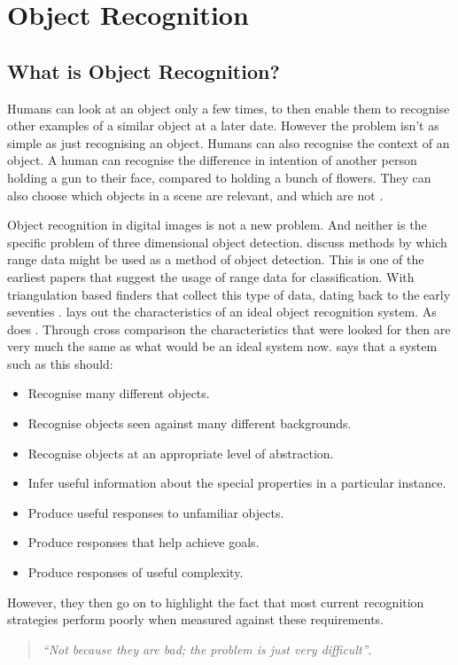 \documentclass[11pt,oneside]{report}
\begin{document}
			\section{Object Recognition}
				\subsection{What is Object Recognition?}
				Humans can look at an object only a few times, to then enable them to recognise other examples of a similar object at a later date.
				However the problem isn't as simple as just recognising an object.
				Humans can also recognise the context of an object.
				A human can recognise the difference in intention of another person holding a gun to their face, compared to holding a bunch of flowers.
				They can also choose which objects in a scene are relevant, and which are not \cite{book:modern}.
				
				Object recognition in digital images is not a new problem.
				And neither is the specific problem of three dimensional object detection.
				 discuss methods by which range data might be used as a method of object detection.
				This is one of the earliest papers that suggest the usage of range data for classification.
				With triangulation based finders that collect this type of data, dating back to the early seventies \cite{journal:range}.
				 lays out the characteristics of an ideal object recognition system.
				As does .
				Through cross comparison the characteristics that were looked for then are very much the same as what would be an ideal system now.
				 says that a system such as this should:
				\begin{itemize}
					\item Recognise many different objects.
					\item Recognise objects seen against many different backgrounds.
					\item Recognise objects at an appropriate level of abstraction.
					\item Infer useful information about the special properties in a particular instance.
					\item Produce useful responses to unfamiliar objects.
					\item Produce responses that help achieve goals.
					\item Produce responses of useful complexity.
				\end{itemize}
				However, they then go on to highlight the fact that most current recognition strategies perform poorly when measured against these requirements.
				\begin{quotation}
					\textit{``Not because they are bad; the problem is just very difficult''}.
				\end{quotation}
\end{document}
